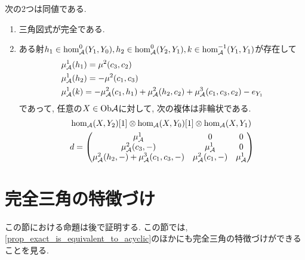 \documentclass[uplatex, a4paper, 14Q, dvipdfmx]{jsarticle}
\begin{document}
\begin{lemma} \label{prop_exact_is_equivalent_to_acyclic}
  次の2つは同値である. 
  \begin{enumerate}
    \item 三角図式が完全である. 
    \item ある射$h_1 \in \hom^0_{\mathcal{A}}(Y_1,Y_0), h_2 \in \hom^0_{\mathcal{A}}(Y_2,Y_1), k \in \hom^{-1}_{\mathcal{A}}(Y_1,Y_1)$が存在して
    \begin{align*}
      &\mu^1_{\mathcal{A}}(h_1) = \mu^2(c_3,c_2) \\
      &\mu^1_{\mathcal{A}}(h_2) = -\mu^2(c_1,c_3) \\
      &\mu^1_{\mathcal{A}}(k) = -\mu^2_{\mathcal{A}}(c_1,h_1) + \mu^2_{\mathcal{A}}(h_2,c_2) + \mu^3_{\mathcal{A}}(c_1,c_3,c_2) -e_{Y_1}
    \end{align*}
    であって, 任意の$X \in \mathrm{Ob}\mathcal{A}$に対して, 次の複体は非輪状である.
    \begin{align*}
      &\hom_{\mathcal{A}}(X,Y_2)[1] \otimes \hom_{\mathcal{A}}(X,Y_0)[1] \otimes \hom_{\mathcal{A}}(X,Y_1) \\
      &d 
      = \begin{pmatrix}
        \mu^1_{\mathcal{A}} & 0 & 0 \\
        \mu^2_{\mathcal{A}}(c_3,-) & \mu^1_{\mathcal{A}} & 0 \\
        \mu^2_{\mathcal{A}}(h_2,-) + \mu^3_{\mathcal{A}}(c_1,c_3,-) & \mu^2_{\mathcal{A}}(c_1,-) & \mu^1_{\mathcal{A}}
      \end{pmatrix}
    \end{align*}
  \end{enumerate}
\end{lemma}

\section{完全三角の特徴づけ}

この節における命題は後で証明する.
この節では, \cref{prop_exact_is_equivalent_to_acyclic}のほかにも完全三角の特徴づけができることを見る. 
\end{document}

